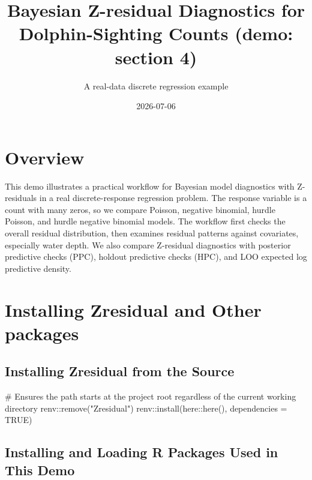 \documentclass[
  english,
  letterpaper,
  DIV=11,
  numbers=noendperiod]{scrartcl}
\title{Bayesian Z-residual Diagnostics for Dolphin-Sighting Counts
(demo: section 4)}
\subtitle{A real-data discrete regression example}
\author{}
\date{2026-07-06}
\newenvironment{Shaded}{\begin{snugshade}}{\end{snugshade}}
\newcommand{\AttributeTok}[1]{\textcolor[rgb]{0.40,0.45,0.13}{#1}}
\newcommand{\CommentTok}[1]{\textcolor[rgb]{0.37,0.37,0.37}{#1}}
\newcommand{\ConstantTok}[1]{\textcolor[rgb]{0.56,0.35,0.01}{#1}}
\newcommand{\FunctionTok}[1]{\textcolor[rgb]{0.28,0.35,0.67}{#1}}
\newcommand{\NormalTok}[1]{\textcolor[rgb]{0.00,0.23,0.31}{#1}}
\newcommand{\SpecialCharTok}[1]{\textcolor[rgb]{0.37,0.37,0.37}{#1}}
\newcommand{\StringTok}[1]{\textcolor[rgb]{0.13,0.47,0.30}{#1}}
\begin{document}
\maketitle


\section{Overview}\label{overview}

This demo illustrates a practical workflow for Bayesian model
diagnostics with Z-residuals in a real discrete-response regression
problem. The response variable is a count with many zeros, so we compare
Poisson, negative binomial, hurdle Poisson, and hurdle negative binomial
models. The workflow first checks the overall residual distribution,
then examines residual patterns against covariates, especially water
depth. We also compare Z-residual diagnostics with posterior predictive
checks (PPC), holdout predictive checks (HPC), and LOO expected log
predictive density.

\section{Installing Zresidual and Other
packages}\label{installing-zresidual-and-other-packages}

\subsection{Installing Zresidual from the
Source}\label{installing-zresidual-from-the-source}

\begin{Shaded}
\begin{Highlighting}[]
\CommentTok{\# Ensures the path starts at the project root regardless of the current working directory}
\NormalTok{renv}\SpecialCharTok{::}\FunctionTok{remove}\NormalTok{(}\StringTok{"Zresidual"}\NormalTok{)}
\NormalTok{renv}\SpecialCharTok{::}\FunctionTok{install}\NormalTok{(here}\SpecialCharTok{::}\FunctionTok{here}\NormalTok{(), }\AttributeTok{dependencies =} \ConstantTok{TRUE}\NormalTok{)}
\end{Highlighting}
\end{Shaded}

\subsection{Installing and Loading R Packages Used in This
Demo}\label{installing-and-loading-r-packages-used-in-this-demo}
\end{document}
